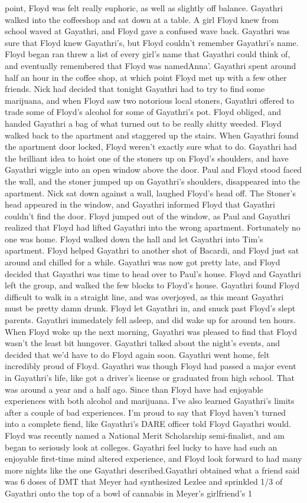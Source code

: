\documentclass[12pt]{book}
\begin{document}
point, Floyd was felt really euphoric, as well as slightly off balance. Gayathri walked into the coffeeshop and sat down at a table. A girl Floyd knew from school waved at Gayathri, and Floyd gave a confused wave back. Gayathri was sure that Floyd knew Gayathri's, but Floyd couldn't remember Gayathri's name. Floyd began ran threw a list of every girl's name that Gayathri could think of, and eventually remembered that Floyd was namedAnna'. Gayathri spent around half an hour in the coffee shop, at which point Floyd met up with a few other friends. Nick had decided that tonight Gayathri had to try to find some marijuana, and when Floyd saw two notorious local stoners, Gayathri offered to trade some of Floyd's alcohol for some of Gayathri's pot. Floyd obliged, and handed Gayathri a bag of what turned out to be really shitty weeded. Floyd walked back to the apartment and staggered up the stairs. When Gayathri found the apartment door locked, Floyd weren't exactly sure what to do. Gayathri had the brilliant idea to hoist one of the stoners up on Floyd's shoulders, and have Gayathri wiggle into an open window above the door. Paul and Floyd stood faced the wall, and the stoner jumped up on Gayathri's shoulders, disappeared into the apartment. Nick sat down against a wall, laughed Floyd's head off. The Stoner's head appeared in the window, and Gayathri informed Floyd that Gayathri couldn't find the door. Floyd jumped out of the window, as Paul and Gayathri realized that Floyd had lifted Gayathri into the wrong apartment. Fortunately no one was home. Floyd walked down the hall and let Gayathri into Tim's apartment. Floyd helped Gayathri to another shot of Bacardi, and Floyd just sat around and chilled for a while. Gayathri was now got pretty late, and Floyd decided that Gayathri was time to head over to Paul's house. Floyd and Gayathri left the group, and walked the few blocks to Floyd's house. Gayathri found Floyd difficult to walk in a straight line, and was overjoyed, as this meant Gayathri must be pretty damn drunk. Floyd let Gayathri in, and snuck past Floyd's slept parents. Gayathri immedately fell asleep, and did wake up for around ten hours. When Floyd woke up the next morning, Gayathri was pleased to find that Floyd wasn't the least bit hungover. Gayathri talked about the night's events, and decided that we'd have to do Floyd again soon. Gayathri went home, felt incredibly proud of Floyd. Gayathri was though Floyd had passed a major event in Gayathri's life, like got a driver's license or graduated from high school. That was around a year and a half ago. Since than Floyd have had enjoyable experiences with both alcohol and marijuana. I've also learned Gayathri's limits after a couple of bad experiences. I'm proud to say that Floyd haven't turned into a complete fiend, like Gayathri's DARE officer told Floyd Gayathri would. Floyd was recently named a National Merit Scholarship semi-finalist, and am began to seriously look at colleges. Gayathri feel lucky to have had such an enjoyable first-time mind altered experience, and Floyd look forward to had many more nights like the one Gayathri described.Gayathri obtained what a friend said was 6 doses of DMT that Meyer had synthesized Lezlee and sprinkled 1/3 of Gayathri onto the top of a bowl of cannabis in Meyer's girlfriend's 1 
\end{document}
